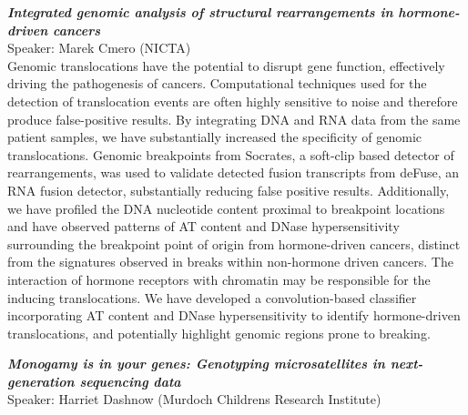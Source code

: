\documentclass[10pt,]{article}
\begin{document}
\begin{minipage}[c]{\linewidth}
\raggedright

\emph{\bfseries Integrated genomic analysis of structural rearrangements in hormone-driven cancers}\\
Speaker: Marek Cmero (NICTA)\\[1ex]
{\small
Genomic translocations have the potential to disrupt gene function,
effectively driving the pathogenesis of cancers. Computational techniques used
for the detection of translocation events are often highly sensitive to noise
and therefore produce false-positive results. By integrating DNA and RNA data
from the same patient samples, we have substantially increased the specificity
of genomic translocations. Genomic breakpoints from Socrates, a soft-clip
based detector of rearrangements, was used to validate detected fusion
transcripts from deFuse, an RNA fusion detector, substantially reducing false
positive results. Additionally, we have profiled the DNA nucleotide content
proximal to breakpoint locations and have observed patterns of AT content and
DNase hypersensitivity surrounding the breakpoint point of origin from
hormone-driven cancers, distinct from the signatures observed in breaks within
non-hormone driven cancers. The interaction of hormone receptors with
chromatin may be responsible for the inducing translocations. We have
developed a convolution-based classifier incorporating AT content and DNase
hypersensitivity to identify hormone-driven translocations, and potentially
highlight genomic regions prone to breaking.}

\vspace{3ex}

\emph{\bfseries Monogamy is in your genes: Genotyping microsatellites in next-generation sequencing data}\\
Speaker: Harriet Dashnow (Murdoch Childrens Research Institute)\\[1ex]


\end{minipage}
\end{document}
